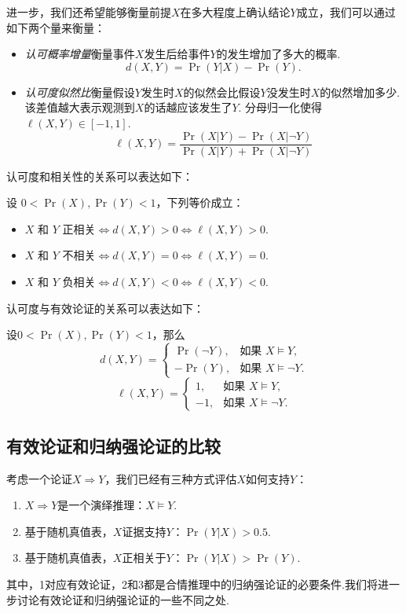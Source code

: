 进一步，我们还希望能够衡量前提$X$在多大程度上确认结论$Y$成立，我们可以通过如下两个量来衡量：
\begin{itemize}[认可度]
\item \emph{认可概率增量}衡量事件$X$发生后给事件$Y$的发生增加了多大的概率.
\[
    d(X, Y) = \Pr(Y|X) - \Pr(Y).
\]
\item \emph{认可度似然比}衡量假设$Y$发生时$X$的似然会比假设$Y$没发生时$X$的似然增加多少. 该差值越大表示观测到$X$的话越应该发生了$Y$. 分母归一化使得$\ell(X,Y)\in[-1,1]$.
\[
    \ell(X, Y) = \frac{\Pr(X|Y) - \Pr(X|\lnot Y)}{\Pr(X|Y) + \Pr(X|\lnot Y)}
\]
\end{itemize} 


认可度和相关性的关系可以表达如下：
\begin{proposition}
    设 $0< \Pr(X),\Pr(Y) < 1$，下列等价成立：
    \begin{itemize}
        \item $X$ 和 $Y$ 正相关$\iff d(X,Y) > 0\iff \ell(X, Y) > 0$.
        \item $X$ 和 $Y$ 不相关$\iff d(X, Y) = 0\iff \ell(X, Y) = 0$. 
        \item $X$ 和 $Y$ 负相关$\iff d(X,Y) < 0\iff\ell(X, Y) < 0$.
    \end{itemize}    
\end{proposition}


认可度与有效论证的关系可以表达如下：
\begin{proposition}
    设$0< \Pr(X),\Pr(Y) < 1$，那么
    \[
        d(X, Y) =
        \begin{cases}
            \Pr(\lnot Y),& \text{如果 } X \models Y, \\
            -\Pr(Y),& \text{如果 } X \models \lnot Y.
        \end{cases}
    \]
    \[\ell(X, Y) = 
        \begin{cases}
            1,& \text{如果 } X \models Y, \\
            -1,& \text{如果 } X \models \lnot Y.
        \end{cases}
    \]
\end{proposition}


\subsection{有效论证和归纳强论证的比较}

考虑一个论证$X\Rightarrow Y$，我们已经有三种方式评估$X$如何支持$Y$：
    \begin{enumerate}
        \item $X\Rightarrow Y$是一个演绎推理：$X\models Y$.
        \item 基于随机真值表，$X$证据支持$Y$：$\Pr(Y|X) > 0.5$.
        \item 基于随机真值表，$X$正相关于$Y$：$\Pr(Y|X) > \Pr(Y)$.
    \end{enumerate}
其中，1对应有效论证，2和3都是合情推理中的归纳强论证的必要条件.我们将进一步讨论有效论证和归纳强论证的一些不同之处.

